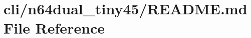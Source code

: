 \hypertarget{cli_2n64dual__tiny45_2README_8md}{\section{cli/n64dual\-\_\-tiny45/\-R\-E\-A\-D\-M\-E.md File Reference}
\label{cli_2n64dual__tiny45_2README_8md}
}
